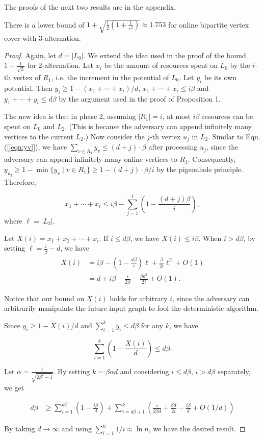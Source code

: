 \documentclass{article}
\begin{document}
The proofs of the next two results are in the appendix.
\begin{proposition}
There is a lower bound of $1+\sqrt{\frac{1}{2}\left(1+\frac{1}{e^2}\right)}\approx1.753$
for online bipartite vertex cover with 3-alternation.
\end{proposition}
\begin{proof}
Again, let $d=|L_{0}|$. We extend the idea used in the proof of the
bound $1+\frac{1}{\sqrt{2}}$ for 2-alternation. Let $x_{i}$ be the
amount of resources spent on $L_{0}$ by the $i$-th vertex of $R_{1}$, i.e. the increment in the potential of $L_0$.
Let $y_{i}$ be its own potential. Then $y_{i}\geq 1-(x_{1}+\cdots+x_{i})/d$,
$x_{1}+\cdots+x_{i}\leq i\beta$ and $y_{1}+\cdots+y_{i}\leq d\beta$ by the argument used in the proof of Proposition 1.

The new idea is that in phase 2, assuming $|R_1| =i$,  at most $i\beta$ resources can be spent
on $L_{0}$ and $L_{2}$. (This is because the adversary can append infinitely many vertices to the current $L_2$.) Now consider the $j$-th vertex $u_j$ in $L_2$. Similar to Eqn.(\ref{[eqn:yv]}), 
we have $\sum_{v\in R_1} y_v \leq (d+j)\cdot \beta$ after processing $u_j$, since the adversary can append infinitely many online vertices to $R_3$. Consequently, $y_{u_j} \geq 1- \min\{y_v \mid v\in R_1 \} \geq 1- (d+j)\cdot \beta/i$ by the pigeonhole principle. Therefore,

\[
x_{1}+\cdots+x_{i}\leq i\beta-\sum_{j=1}^{\ell}\left(1-\frac{(d+j)\beta}{i}\right),
\]
where $\ell = |L_2|$.


Let $X(i)=x_1+x_2+\cdots+x_i$.
If $i \le d\beta$, we have $X(i) \leq i\beta$. When $i>d\beta$, by setting $\ell = \frac{i}{\beta} - d$, we have 
\begin{align}
X(i) &= i\beta - \left(1-\frac{d\beta}{i}\right)\ell+\frac{\beta}{2i}\ell^2+O(1) \nonumber\\
&= d+i\beta-\frac{i}{2\beta}-\frac{\beta d^2}{2i}+O(1).\nonumber
\label{eqn:Xi}
\end{align}

Notice that our bound on $X(i)$ holds for arbitrary $i$, since the adversary can arbitrarily manipulate the future input graph to fool the deterministic algorithm.


Since $y_i\geq 1-X(i)/d$ and $\sum_{i=1}^k y_i \leq d\beta$ for any $k$, we have

\[
\sum_{i=1}^k \left(1-\frac{X(i)}{d}\right) \leq d\beta.
\]


Let $\alpha = \frac{1}{\sqrt{2\beta^2-1}}$. By setting $k = \beta \alpha d$ and considering $i\leq d\beta$, $i>d\beta$ separately,
we get

\begin{align}
d\beta &\geq \sum_{i=1}^{d\beta} \left(1-\frac{i\beta}{d}\right) +\sum_{i=d\beta +1}^k \left(\frac{i}{2\beta d}+\frac{\beta d}{2i}-\frac{i\beta}{d}+O(1/d)\right)\nonumber
\end{align}


By taking $d\longrightarrow\infty$ and using $\sum_{i=1}^n 1/i\approx \ln n$, we have the desired result.


\end{proof}
\end{document}

